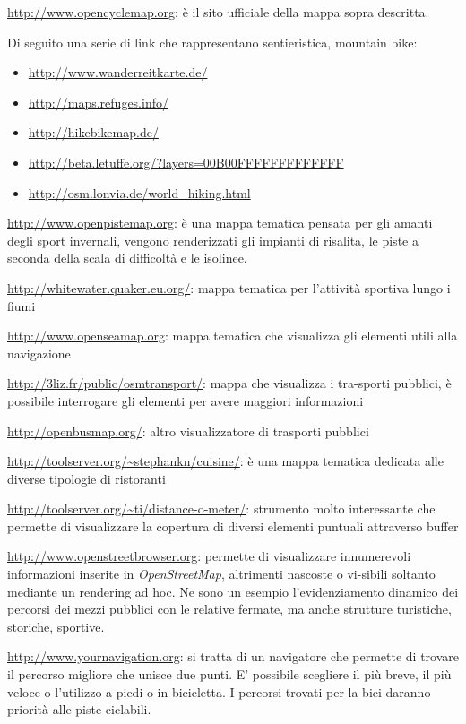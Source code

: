 \documentclass[a4paper,twoside,12pt,]{article}
\newcommand{\osm}{\emph{OpenStreetMap\xspace}}
\begin{document}
\url{http://www.opencyclemap.org}: è il sito ufficiale della mappa sopra descritta.

Di seguito una serie di link che rappresentano sentieristica, mountain bike:
\begin{itemize}
 \item \url{http://www.wanderreitkarte.de/}
 \item \url{http://maps.refuges.info/}
 \item \url{http://hikebikemap.de/}
 \item \url{http://beta.letuffe.org/?layers=00B00FFFFFFFFFFFFF}
 \item \url{http://osm.lonvia.de/world_hiking.html}
\end{itemize}

\url{http://www.openpistemap.org}: è una mappa tematica pensata per gli amanti degli sport invernali, vengono renderizzati gli impianti di risalita, le piste a seconda della scala di difficoltà e le isolinee. 

\url{http://whitewater.quaker.eu.org/}: mappa tematica per l'attività sportiva lungo i fiumi

\url{http://www.openseamap.org}: mappa tematica che visualizza gli elementi utili alla navigazione

\url{http://3liz.fr/public/osmtransport/}: mappa che visualizza i tra-sporti pubblici, è possibile interrogare gli elementi per avere maggiori informazioni

\url{http://openbusmap.org/}: altro visualizzatore di trasporti pubblici

\url{http://toolserver.org/~stephankn/cuisine/}: è una mappa tematica dedicata alle diverse tipologie di ristoranti

\url{http://toolserver.org/~ti/distance-o-meter/}: strumento molto interessante che permette di visualizzare la copertura di diversi elementi puntuali attraverso buffer

\url{http://www.openstreetbrowser.org}: permette di visualizzare innumerevoli informazioni inserite in \osm, altrimenti nascoste o vi-sibili soltanto mediante un rendering ad hoc. Ne sono un esempio l'evidenziamento dinamico dei percorsi dei mezzi pubblici con le relative fermate, ma anche strutture turistiche, storiche, sportive.

\url{http://www.yournavigation.org}: si tratta di un navigatore che permette di trovare il percorso migliore che unisce due punti. E' possibile scegliere il più breve, il più veloce o l'utilizzo a piedi o in bicicletta. I percorsi trovati per la bici daranno priorità alle piste ciclabili.
\end{document}
